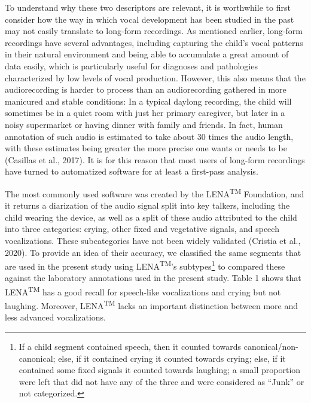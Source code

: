 \documentclass[english,,man]{apa6}
\begin{document}
To understand why these two descriptors are relevant, it is worthwhile to first consider how the way in which vocal development has been studied in the past may not easily translate to long-form recordings. As mentioned earlier, long-form recordings have several advantages, including capturing the child's vocal patterns in their natural environment and being able to accumulate a great amount of data easily, which is particularly useful for diagnoses and pathologies characterized by low levels of vocal production. However, this also means that the audiorecording is harder to process than an audiorecording gathered in more manicured and stable conditions: In a typical daylong recording, the child will sometimes be in a quiet room with just her primary caregiver, but later in a noisy supermarket or having dinner with family and friends. In fact, human annotation of such audio is estimated to take about 30 times the audio length, with these estimates being greater the more precise one wants or needs to be (Casillas et al., 2017). It is for this reason that most users of long-form recordings have turned to automatized software for at least a first-pass analysis.

The most commonly used software was created by the LENA\textsuperscript{TM} Foundation, and it returns a diarization of the audio signal split into key talkers, including the child wearing the device, as well as a split of these audio attributed to the child into three categories: crying, other fixed and vegetative signals, and speech vocalizations. These subcategories have not been widely validated (Cristia et al., 2020). To provide an idea of their accuracy, we classified the same segments that are used in the present study using LENA\textsuperscript{TM}'s subtypes\footnote{If a child segment contained speech, then it counted towards canonical/non-canonical; else, if it contained crying it counted towards crying; else, if it contained some fixed signals it counted towards laughing; a small proportion were left that did not have any of the three and were considered as \enquote{Junk} or not categorized.} to compared these against the laboratory annotations used in the present study. Table 1 shows that LENA\textsuperscript{TM} has a good recall for speech-like vocalizations and crying but not laughing. Moreover, LENA\textsuperscript{TM} lacks an important distinction between more and less advanced vocalizations.
\end{document}
